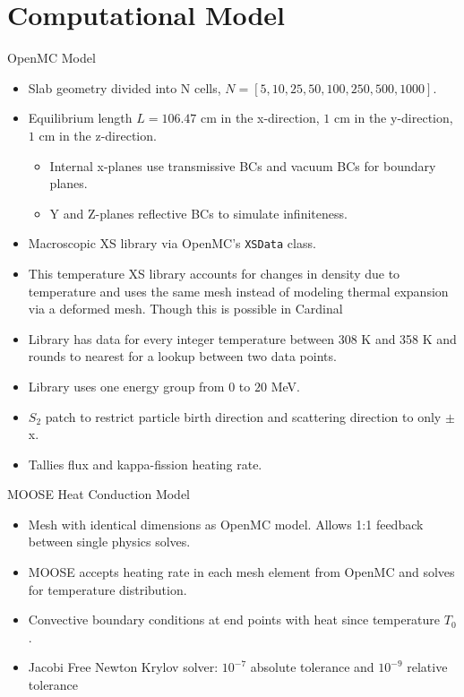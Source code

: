 \documentclass[9pt,t]{beamer}
\begin{document}
\section{Computational Model}
\begin{frame}{OpenMC Model}
    \pause
    \begin{itemize}
        \item<2->Slab geometry divided into N cells, $N=[5, 10, 25, 50, 100, 250, 500, 1000]$.
        \item<3-> Equilibrium length $L=106.47$ cm in the x-direction, $1$ cm in the y-direction, $1$ cm in the z-direction.
        \begin{itemize}
            \item<4-> Internal x-planes use transmissive BCs and vacuum BCs for boundary planes.
            \item<5-> Y and Z-planes reflective BCs to simulate infiniteness.
        \end{itemize}
        \item<6-> Macroscopic XS library via OpenMC's \texttt{XSData} class.
        \item<7-> This temperature XS library accounts for changes in density due to temperature and uses the same mesh instead of modeling thermal expansion via a deformed mesh. Though this is possible in Cardinal \cite{novak-2023}
        \item<8-> Library has data for every integer temperature between 308 K and 358 K and rounds to nearest for a lookup between two data points.
        \item<9-> Library uses one energy group from $0$ to $20$ MeV.
        \item<10-> $S_{2}$ patch to restrict particle birth direction and scattering direction to only $\pm$x.
        \item<11->Tallies flux and kappa-fission heating rate.
    \end{itemize}
\end{frame}

\begin{frame}{MOOSE Heat Conduction Model}
    \begin{itemize}
        \item Mesh with identical dimensions as OpenMC model. Allows 1:1 feedback between single physics solves.
        \item MOOSE accepts heating rate in each mesh element from OpenMC and solves for temperature distribution.
        \item Convective boundary conditions at end points with heat since temperature $T_{0}$.
        \item Jacobi Free Newton Krylov solver: $10^{-7}$ absolute tolerance and $10^{-9}$ relative tolerance
    \end{itemize}
\end{frame}
\end{document}
